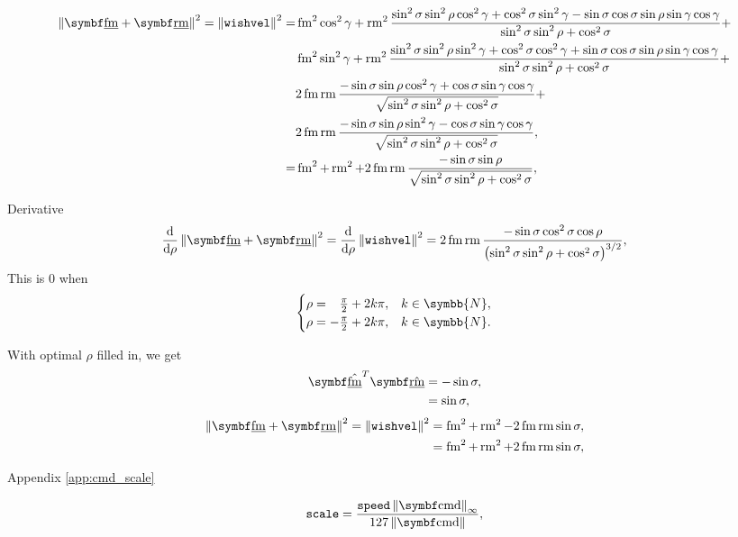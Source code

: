 \begin{align*}
\norm{\vec{\flat{\fmove}} + \vec{\flat{\rmove}}}^2 = \norm{\texttt{wishvel}}^2 = &\fmove^2 \cos^2\gamma + \rmove^2 \frac{\sin^2\sigma\sin^2\rho\cos^2\gamma + \cos^2\sigma\sin^2\gamma - \sin\sigma\cos\sigma\sin\rho\sin\gamma\cos\gamma}{\sin^2\sigma\sin^2\rho + \cos^2\sigma} +\\
&\fmove^2 \sin^2\gamma + \rmove^2 \frac{\sin^2\sigma\sin^2\rho\sin^2\gamma + \cos^2\sigma\cos^2\gamma + \sin\sigma\cos\sigma\sin\rho\sin\gamma\cos\gamma}{\sin^2\sigma\sin^2\rho + \cos^2\sigma} +\\
&2\fmove\rmove\frac{-\sin\sigma\sin\rho\cos^2\gamma + \cos\sigma\sin\gamma\cos\gamma}{\sqrt{\sin^2\sigma\sin^2\rho + \cos^2\sigma}} +\\
&2\fmove\rmove\frac{-\sin\sigma\sin\rho\sin^2\gamma - \cos\sigma\sin\gamma\cos\gamma}{\sqrt{\sin^2\sigma\sin^2\rho + \cos^2\sigma}},\\
%
= &\fmove^2 + \rmove^2 + 2\fmove\rmove\frac{-\sin\sigma\sin\rho}{\sqrt{\sin^2\sigma\sin^2\rho + \cos^2\sigma}},
\end{align*}

Derivative
\begin{align*}
\frac{\mathrm{d}}{\mathrm{d}\rho} \norm{\vec{\flat{\fmove}} + \vec{\flat{\rmove}}}^2 = \frac{\mathrm{d}}{\mathrm{d}\rho} \norm{\texttt{wishvel}}^2 = 2\fmove\rmove\frac{-\sin\sigma\cos^2\sigma\cos\rho}{\left( \sin^2\sigma\sin^2\rho + \cos^2\sigma \right)^{3/2}},
\end{align*}
This is $0$ when
\[
\begin{cases}
	\rho = \hphantom{-}\frac{\pi}{2} + 2k\pi, &k \in \symbb{N},\\
	\rho = -\frac{\pi}{2} + 2k\pi, &k \in \symbb{N}.
\end{cases}
\]

With optimal $\rho$ filled in, we get
\begin{align*}
\uvec{\flat{\fmove}}^T \uvec{\flat{\rmove}} &= -\sin\sigma,\\
&= \sin\sigma,
\end{align*}
\begin{align*}
\norm{\vec{\flat{\fmove}} + \vec{\flat{\rmove}}}^2 = \norm{\texttt{wishvel}}^2 &= \fmove^2 + \rmove^2 - 2\fmove\rmove\sin\sigma,\\
&= \fmove^2 + \rmove^2 + 2\fmove\rmove\sin\sigma,
\end{align*}

Appendix \ref{app:cmd_scale}

\begin{align*}
\texttt{scale} = \frac{\texttt{speed}\norm{\vec{\cmd}}_{\infty}}{127\norm{\vec{\cmd}}},
\end{align*}

